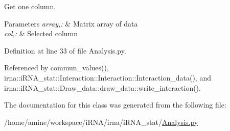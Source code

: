 \-Get one column. 


\begin{DoxyParams}{\-Parameters}
{\em array,\-:} & \-Matrix array of data \\
\hline
{\em col,\-:} & \-Selected column \\
\hline
\end{DoxyParams}


\-Definition at line 33 of file \-Analysis.\-py.



\-Referenced by commun\-\_\-values(), irna\-::i\-R\-N\-A\-\_\-stat\-::\-Interaction\-::\-Interaction\-::\-Interaction\-\_\-data(), and irna\-::i\-R\-N\-A\-\_\-stat\-::\-Draw\-\_\-data\-::draw\-\_\-data\-::write\-\_\-interaction().



\-The documentation for this class was generated from the following file\-:\begin{DoxyCompactItemize}
\item 
/home/amine/workspace/i\-R\-N\-A/irna/i\-R\-N\-A\-\_\-stat/\hyperlink{Analysis_8py}{\-Analysis.\-py}\end{DoxyCompactItemize}
